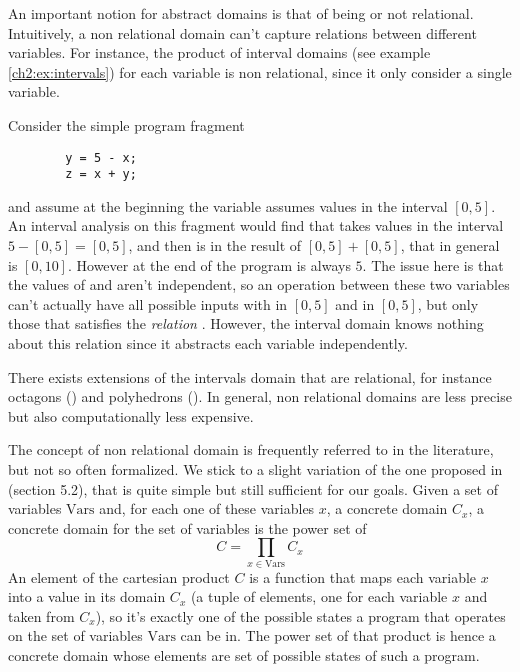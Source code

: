 An important notion for abstract domains is that of being or not relational. Intuitively, a non relational domain can't capture relations between different variables. For instance, the product of interval domains (see example \ref{ch2:ex:intervals}) for each variable is non relational, since it only consider a single variable.
\begin{example}
	Consider the simple program fragment
	\begin{verbatim}
		y = 5 - x;
		z = x + y;
	\end{verbatim}
	and assume at the beginning the variable  assumes values in the interval $[0, 5]$. An interval analysis on this fragment would find that  takes values in the interval $5 - [0, 5] = [0, 5]$, and then  is in the result of $[0, 5] + [0, 5]$, that in general is $[0, 10]$. However at the end of the program  is always $5$.
	The issue here is that the values of  and  aren't independent, so an operation between these two variables can't actually have all possible inputs with  in $[0, 5]$ and  in $[0, 5]$, but only those that satisfies the \textit{relation} . However, the interval domain knows nothing about this relation since it abstracts each variable independently.
\end{example}
There exists extensions of the intervals domain that are relational, for instance octagons (\cite{mine-octagons}) and polyhedrons (\cite{cousot-polyhedrons}). In general, non relational domains are less precise but also computationally less expensive.

The concept of non relational domain is frequently referred to in the literature, but not so often formalized. We stick to a slight variation of the one proposed in \cite{giacobazzi-analyzing-analyses} (section 5.2), that is quite simple but still sufficient for our goals.
Given a set of variables $\text{Vars}$ and, for each one of these variables $x$, a concrete domain $C_x$, a concrete domain for the set of variables is the power set of
\[
C = \prod\limits_{x \in \text{Vars}} C_x
\]
An element of the cartesian product $C$ is a function that maps each variable $x$ into a value in its domain $C_x$ (a tuple of elements, one for each variable $x$ and taken from $C_x$), so it's exactly one of the possible states a program that operates on the set of variables $\text{Vars}$ can be in. The power set of that product is hence a concrete domain whose elements are set of possible states of such a program.

